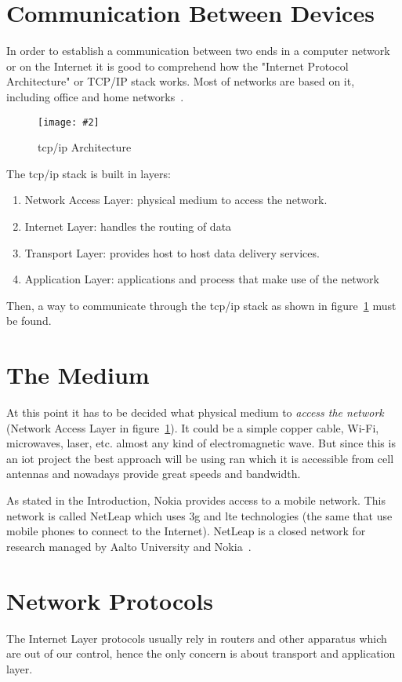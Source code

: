 \documentclass[hidelinks,11pt,a4paper,oneside,article]{memoir}
\newcommand{\putimage}[3][10] %
{
\begin{figure}[h]
	\centering
	\captionsetup{justification=centering}
	\texttt{[image: \#2]}
	\caption{#3}
	\label{fig:#2}
\end{figure}
}
\begin{document}
\section{Communication Between Devices}
In order to establish a communication between two ends in a computer network or on the Internet it is good to comprehend how the "Internet Protocol Architecture" or TCP/IP stack works. Most of networks are based on it, including office and home networks~\cite[9]{tcpip}.

	\putimage[5]{tcpip}{\gls{tcp}/\gls{ip} Architecture}

The \gls{tcp}/\gls{ip} stack is built in layers:
\begin{enumerate}
	\item Network Access Layer: physical medium to access the network.
	\item Internet Layer: handles the routing of data
	\item Transport Layer: provides host to host data delivery services.
	\item Application Layer: applications and process that make use of the network
\end{enumerate}

Then, a way to communicate through the \gls{tcp}/\gls{ip} stack as shown in figure~\ref{fig:tcpip} must be found.

\section{The Medium}\label{sec:the-medium}
At this point it has to be decided what physical medium to \textit{access the network} (Network Access Layer in figure~\ref{fig:tcpip}). It could be a simple copper cable, Wi-Fi, microwaves, laser, etc. almost any kind of electromagnetic wave. But since this is an \gls{iot} project the best approach will be using \gls{ran} which it is accessible from cell antennas and nowadays provide great speeds and bandwidth.

As stated in the Introduction, Nokia provides access to a mobile network. This network is called NetLeap which uses \gls{3g} and \gls{lte} technologies (the same that use mobile phones to connect to the Internet). NetLeap is a closed network for research managed by Aalto University and Nokia~\cite{netleap}.

\section{Network Protocols}
The Internet Layer protocols usually rely in routers and other apparatus which are out of our control, hence the only concern is about transport and application layer.
\end{document}
